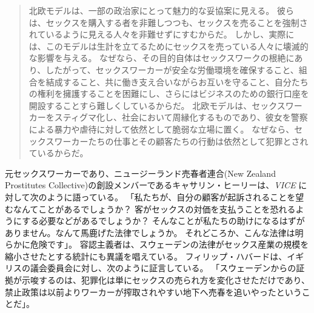 \documentclass[paper=a4,book,openany]{jlreq}
\begin{document}
\begin{quote}
北欧モデルは、一部の政治家にとって魅力的な妥協案に見える。
彼らは、セックスを購入する者を非難しつつも、セックスを売ることを強制されているように見える人々を非難せずにすむからだ。
しかし、実際には、このモデルは生計を立てるためにセックスを売っている人々に壊滅的な影響を与える。
なぜなら、その目的自体はセックスワークの根絶にあり、したがって、セックスワーカーが安全な労働環境を確保すること、組合を結成すること、共に働き支え合いながらお互いを守ること、自分たちの権利を擁護することを困難にし、さらにはビジネスのための銀行口座を開設することすら難しくしているからだ。
北欧モデルは、セックスワーカーをスティグマ化し、社会において周縁化するものであり、彼女を警察による暴力や虐待に対して依然として脆弱な立場に置く。
なぜなら、セックスワーカーたちの仕事とその顧客たちの行動は依然として犯罪とされているからだ。
\citep{watch19:_why_sex_work_shoul_be_decrim}
\end{quote}

元セックスワーカーであり、ニュージーランド売春者連合(New Zealand Prostitutes Collective)の創設メンバーであるキャサリン・ヒーリーは、\emph{VICE} に対して次のように語っている。
「私たちが、自分の顧客が起訴されることを望むなんてことがあるでしょうか？ 客がセックスの対価を支払うことを恐れるようにする必要などがあるでしょうか？ そんなことが私たちの助けになるはずがありません。なんて馬鹿げた法律でしょうか。
それどころか、こんな法律は明らかに危険です」\citep{mcclure17:_what_happen_when_sex_worker}。
容認主義者は、スウェーデンの法律がセックス産業の規模を縮小させたとする統計にも異議を唱えている。
フィリップ・ハバードは、イギリスの議会委員会に対し、次のように証言している。
「スウェーデンからの証拠が示唆するのは、犯罪化は単にセックスの売られ方を変化させただけであり、禁止政策は以前よりワーカーが搾取されやすい地下へ売春を追いやったということだ」\citep[p.25]{commons16:_prost}。
\end{document}
